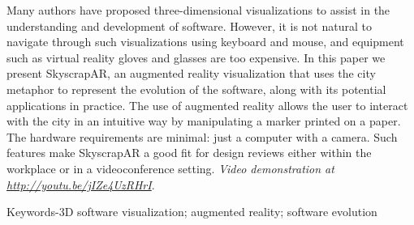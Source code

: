 Many authors have proposed three-dimensional visualizations to assist in the understanding and development of software. However, it is not natural to navigate through such visualizations using keyboard and mouse, and equipment such as virtual reality gloves and glasses are too expensive. In this paper we present SkyscrapAR, an augmented reality visualization that uses the city metaphor to represent the evolution of the software, along with its potential applications in practice. The use of augmented reality allows the user to interact with the city in an intuitive way by manipulating a marker printed on a paper. The hardware requirements are minimal: just a computer with a camera. Such features make SkyscrapAR a good fit for design reviews either within the workplace or in a videoconference setting. 
\emph{Video demonstration at \url{http://youtu.be/jIZe4UzRHrI}}.

Keywords-3D software visualization; augmented reality; software evolution
